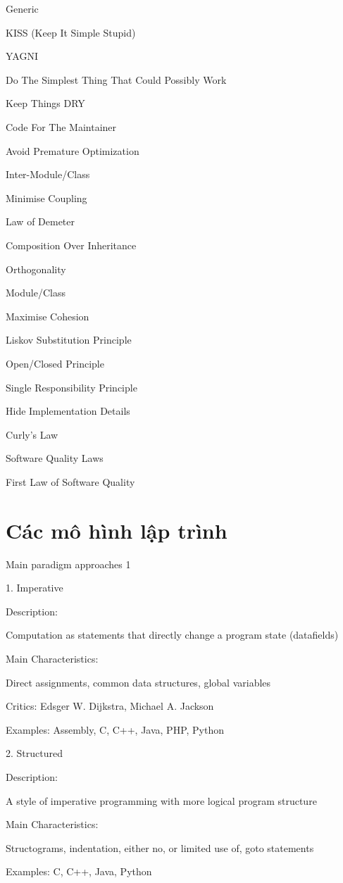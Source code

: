 Generic

KISS (Keep It Simple Stupid)

YAGNI

Do The Simplest Thing That Could Possibly Work

Keep Things DRY

Code For The Maintainer

Avoid Premature Optimization

Inter-Module/Class

Minimise Coupling

Law of Demeter

Composition Over Inheritance

Orthogonality

Module/Class

Maximise Cohesion

Liskov Substitution Principle

Open/Closed Principle

Single Responsibility Principle

Hide Implementation Details

Curly's Law

Software Quality Laws

First Law of Software Quality


\section{Các mô hình lập trình}

Main paradigm approaches 1

1. Imperative


Description:

Computation as statements that directly change a program state (datafields)

Main Characteristics:

Direct assignments, common data structures, global variables

Critics: Edsger W. Dijkstra, Michael A. Jackson

Examples: Assembly, C, C++, Java, PHP, Python

2. Structured

Description:

A style of imperative programming with more logical program structure

Main Characteristics:

Structograms, indentation, either no, or limited use of, goto statements

Examples: C, C++, Java, Python

